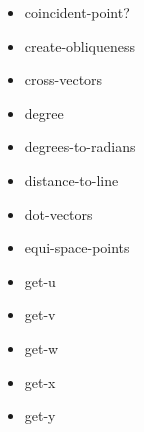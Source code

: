 \documentclass [11pt]{book}
\begin{document}
\begin{itemize}
\item {}coincident-point?





\item {}create-obliqueness





\item {}cross-vectors





\item {}degree





\item {}degrees-to-radians





\item {}distance-to-line





\item {}dot-vectors





\item {}equi-space-points





\item {}get-u





\item {}get-v





\item {}get-w





\item {}get-x





\item {}get-y






\end{itemize}
\end{document}
